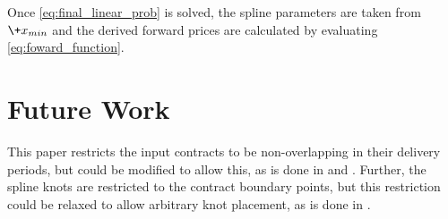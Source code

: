 \documentclass{article}
\begin{document}
Once \ref{eq:final_linear_prob} is solved, the spline parameters are taken from $\+{x_{min}}$
and the derived forward prices are calculated by evaluating \ref{eq:foward_function}.

\section{Future Work}
This paper restricts the input contracts to be non-overlapping in their delivery periods,
but could be modified to allow this, as is done in \cite{Benth} and \cite{Fowler}. Further,
the spline knots are restricted to the contract boundary points, but this restriction
could be relaxed to allow arbitrary knot placement, as is done in \cite{Fowler}.



\end{document}
